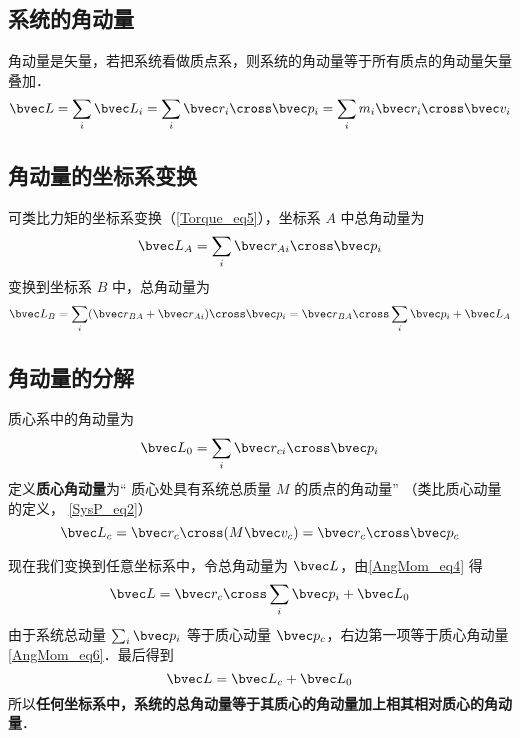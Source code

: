 

\subsection{系统的角动量}
角动量是矢量，若把系统看做质点系，则系统的角动量等于所有质点的角动量矢量叠加．
\begin{equation}\label{AngMom_eq1}
\bvec L = \sum_i \bvec L_i = \sum_i \bvec r_i \cross\bvec p_i = \sum_i m_i \bvec r_i \cross\bvec v_i
\end{equation}

\subsection{角动量的坐标系变换}
可类比力矩的坐标系变换（\autoref{Torque_eq5}），坐标系 $A$ 中总角动量为
\begin{equation}
\bvec L_A = \sum_i \bvec r_{Ai} \cross \bvec p_i 
\end{equation}
变换到坐标系 $B$ 中，总角动量为
\begin{equation}\label{AngMom_eq4}
\bvec L_B = \sum_i (\bvec r_{BA} + \bvec r_{Ai})\cross \bvec p_i = \bvec r_{BA}\cross \sum_i \bvec p_i + \bvec L_A
\end{equation}

\subsection{角动量的分解}
质心系中的角动量为
\begin{equation}\label{AngMom_eq5}
\bvec L_0 = \sum_i \bvec r_{ci} \cross \bvec p_i
\end{equation}
定义\textbf{质心角动量}为“ 质心处具有系统总质量 $M$ 的质点的角动量” （类比质心动量的定义， \autoref{SysP_eq2}）
\begin{equation}\label{AngMom_eq6}
\bvec L_c  = \bvec r_c \cross (M \bvec v_c) = \bvec r_c \cross \bvec p_c
\end{equation}

现在我们变换到任意坐标系中，令总角动量为 $\bvec L$，由\autoref{AngMom_eq4} 得
\begin{equation}
\bvec L = \bvec r_{c} \cross \sum_i \bvec p_i + \bvec L_0
\end{equation}
由于系统总动量 $\sum_i \bvec p_i$ 等于质心动量 $\bvec p_c$，右边第一项等于质心角动量\autoref{AngMom_eq6}．最后得到
\begin{equation}
\bvec L = \bvec L_c + \bvec L_0
\end{equation}
所以\textbf{任何坐标系中，系统的总角动量等于其质心的角动量加上相其相对质心的角动量}．
